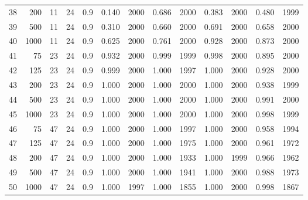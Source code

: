 \documentclass{article}
\begin{document}
\begin{table}[ht]
\begin{center}
\begin{tabular}{rrrrrrrrrrrrr}
  38 & 200 & 11 & 24 & 0.9 & 0.140 & 2000 & 0.686 & 2000 & 0.383 & 2000 & 0.480 & 1999 \\ 
  39 & 500 & 11 & 24 & 0.9 & 0.310 & 2000 & 0.660 & 2000 & 0.691 & 2000 & 0.658 & 2000 \\ 
  40 & 1000 & 11 & 24 & 0.9 & 0.625 & 2000 & 0.761 & 2000 & 0.928 & 2000 & 0.873 & 2000 \\ 
   \hline
41 & 75 & 23 & 24 & 0.9 & 0.932 & 2000 & 0.999 & 1999 & 0.998 & 2000 & 0.895 & 2000 \\ 
  42 & 125 & 23 & 24 & 0.9 & 0.999 & 2000 & 1.000 & 1997 & 1.000 & 2000 & 0.928 & 2000 \\ 
  43 & 200 & 23 & 24 & 0.9 & 1.000 & 2000 & 1.000 & 2000 & 1.000 & 2000 & 0.938 & 1999 \\ 
  44 & 500 & 23 & 24 & 0.9 & 1.000 & 2000 & 1.000 & 2000 & 1.000 & 2000 & 0.991 & 2000 \\ 
  45 & 1000 & 23 & 24 & 0.9 & 1.000 & 2000 & 1.000 & 2000 & 1.000 & 2000 & 0.998 & 1999 \\ 
   \hline
46 & 75 & 47 & 24 & 0.9 & 1.000 & 2000 & 1.000 & 1997 & 1.000 & 2000 & 0.958 & 1994 \\ 
  47 & 125 & 47 & 24 & 0.9 & 1.000 & 2000 & 1.000 & 1975 & 1.000 & 2000 & 0.961 & 1972 \\ 
  48 & 200 & 47 & 24 & 0.9 & 1.000 & 2000 & 1.000 & 1933 & 1.000 & 1999 & 0.966 & 1962 \\ 
  49 & 500 & 47 & 24 & 0.9 & 1.000 & 2000 & 1.000 & 1941 & 1.000 & 2000 & 0.988 & 1973 \\ 
  50 & 1000 & 47 & 24 & 0.9 & 1.000 & 1997 & 1.000 & 1855 & 1.000 & 2000 & 0.998 & 1867 \\ 
   \hline
\end{tabular}
\end{center}
\end{table}
\end{document}
